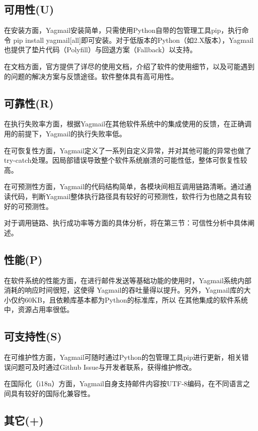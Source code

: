 \documentclass[UTF8,12pt,a4paper]{ctexart}
\begin{document}
\subsection{可用性(U)}

在安装方面，Yagmail安装简单，只需使用Python自带的包管理工具pip，执行命令
pip install yagmail[all]即可安装。对于低版本的Python（如2.X版本），Yagmail
也提供了垫片代码（Polyfill）与回退方案（Fallback）以支持。

在文档方面，官方提供了详尽的使用文档，介绍了软件的使用细节，以及可能遇到的问题的解决方案与反馈途径。软件整体具有高可用性。

\subsection{可靠性(R)}

在执行失败率方面，根据Yagmail在其他软件系统中的集成使用的反馈，在正确调用的前提下，Yagmail的执行失败率低。

在可恢复性方面，Yagmail定义了一系列自定义异常，并对其他可能的异常也做了try-catch处理。因局部错误导致整个软件系统崩溃的可能性低，整体可恢复性较高。

在可预测性方面，Yagmail的代码结构简单，各模块间相互调用链路清晰。通过通读代码，判断Yagmail整体执行路径具有较好的可预测性，软件行为也随之具有较好的可预测性。

对于调用链路、执行成功率等方面的具体分析，将在第三节：可信性分析中具体阐述。

\subsection{性能(P)}

在软件系统的性能方面，在进行邮件发送等基础功能的使用时，Yagmail系统内部消耗的响应时间很短，这使得
Yagmail的吞吐量得以提升。另外，Yagmail库的大小仅约60KB，且依赖库基本都为Python的标准库，所以
在其他集成的软件系统中，资源占用率很低。

\subsection{可支持性(S)}

在可维护性方面，Yagmail可随时通过Python的包管理工具pip进行更新，相关错误问题可及时通过Github Issue与开发者联系，获得维护修改。

在国际化（i18n）方面，Yagmail自身支持邮件内容按UTF-8编码，在不同语言之间具有较好的国际化兼容性。

\subsection{其它(+)}
\end{document}

